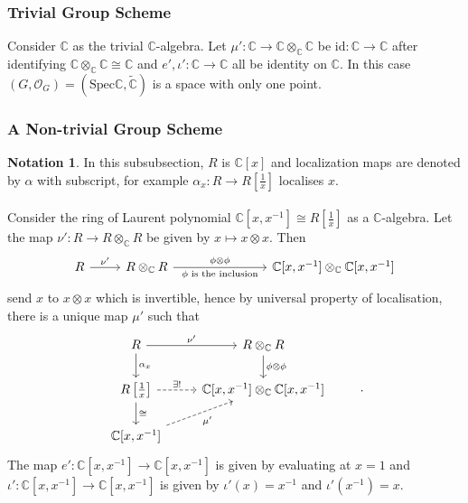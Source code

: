 \documentclass{article}
\theoremstyle{definition}
\newtheorem*{notation}{Notation}
\newcommand{\Spec}{\mathrm{Spec}}
\newcommand{\ssheaf}[1]{\widetilde{#1}}
\newcommand{\tensorC}[2]{#1\otimes_\mathbb C #2}
\newcommand{\tensor}[2]{#1\otimes#2}
\newcommand{\so}[1]{(#1, \mathcal O_{#1})}
\newcommand{\id}{\mathrm{id}}
\newcommand{\sr}[1]{(\Spec{#1},\ssheaf{#1})}
\begin{document}
\subsubsection{Trivial Group Scheme}
Consider $\mathbb C$ as the trivial $\mathbb C$-algebra. Let $\mu': \mathbb C\to\tensorC{\mathbb C}{\mathbb C}$ be $\id:\mathbb C\to\mathbb C$ after identifying $\tensorC{\mathbb C}{\mathbb C}\cong\mathbb C$ and $e',\iota':\mathbb C\to\mathbb C$ all be identity on $\mathbb C$. In this case $\so G=\sr{\mathbb C}$ is a space with only one point.

\subsubsection{A Non-trivial Group Scheme}
\label{sec:hopf-algebra}
\begin{notation}
In this subsubsection, $R$ is $\mathbb C[x]$ and localization maps are denoted by $\alpha$ with subscript, for example $\alpha_x : R\to R\left[\frac1x\right]$ localises $x$.
\end{notation}
\paragraph{} Consider the ring of Laurent polynomial $\mathbb C[x,x^{-1}]\cong R\left[\frac1x\right]$ as a $\mathbb C$-algebra. Let the map $\nu':R\to\tensorC R R$ be given by $x\mapsto \tensor x x$. Then 
\begin{equation*}
\begin{tikzcd}
R\arrow[r, "\nu'"] & \tensorC R R \arrow[r, "\tensor\phi\phi", "\phi\text{ is the inclusion}"'] %
&[5em] \tensorC{\mathbb C[x,x^{-1}]}{\mathbb C[x, x^{-1}]}
\end{tikzcd}
\end{equation*}
send $x$ to $\tensor x x$ which is invertible, hence by universal property of localisation, there is a unique map $\mu'$ such that
\begin{equation*}
\begin{tikzcd}
R\arrow[r, "\nu'"]\arrow[d, "\alpha_x"] & \tensorC R R\arrow[d, "\tensor \phi \phi"] & \\
R\left[\frac1x\right]\arrow[r, dashed, "\exists!"]\arrow[d, "\cong"] & \tensorC{\mathbb C[x,x^{-1}]}{\mathbb C[x, x^{-1}]} \\
\mathbb C[x, x^{-1}]\arrow[ru, dashed, "\mu'"']
\end{tikzcd}.
\end{equation*}
The map $e':\mathbb C[x,x^{-1}]\to\mathbb C[x,x^{-1}]$ is given by evaluating at $x=1$ and $\iota': \mathbb C[x,x^{-1}]\to\mathbb C[x,x^{-1}]$ is given by $\iota'(x)=x^{-1}$ and $\iota'(x^{-1})=x$. 
\end{document}
